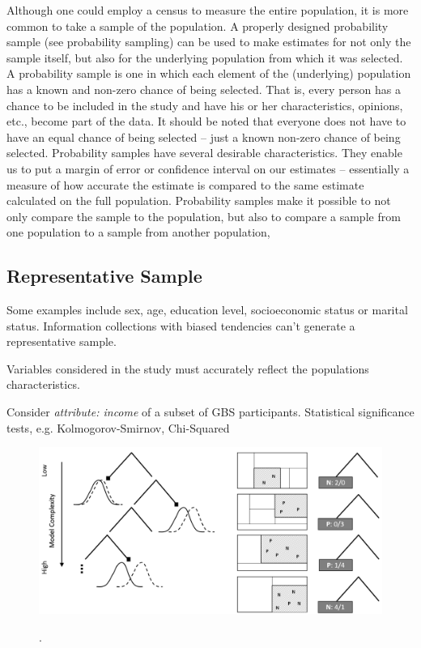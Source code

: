 Although one could employ a census to measure the entire population, it is more common to take a sample of the population. A properly designed probability sample (see probability sampling) can be used to make estimates for not only the sample itself, but also for the underlying population from which it was selected. A probability sample is one in which each element of the (underlying) population has a known and non-zero chance of being selected. That is, every person has a chance to be included in the study and have his or her characteristics, opinions, etc., become part of the data. It should be noted that everyone does not have to have an equal chance of being selected – just a known non-zero chance of being selected. 
Probability samples have several desirable characteristics. They enable us to put a margin of error or confidence interval on our estimates – essentially a measure of how accurate the estimate is compared to the same estimate calculated on the full population. Probability samples make it possible to not only compare the sample to the population, but also to compare a sample from one population to a sample from another population,

\subsection{Representative Sample}

Some examples include sex, age, education level, socioeconomic status or marital status. Information collections with biased tendencies can't generate a representative sample.

Variables considered in the study must accurately reflect the populations characteristics. 

Consider \textit{attribute: income} of a subset of GBS participants. Statistical significance tests, e.g. Kolmogorov-Smirnov, Chi-Squared

\begin{figure}[ht]
	\begin{center}
		\includegraphics[scale=0.40,angle=0]{fig/tree3}
		\label{project}
		\caption{.}
	\end{center}
\end{figure}

